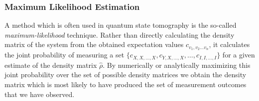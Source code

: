 \subsubsection{Maximum Likelihood Estimation}

A method which is often used in quantum state tomography is the so-called {\it maximum-likelihood} technique. Rather than directly calculating the density matrix of the system from the obtained expectation values $c_{v_1,v_2\hdots v_n}$, it calculates the joint probability of measuring a set $\{c_{X,X,\hdots,X},c_{Y,X,\hdots,X},\hdots,c_{I,I,\hdots,I}\}$ for a given estimate of the density matrix $\hat{\rho}$. By numerically or analytically maximizing this joint probability over the set of possible density matrices we obtain the density matrix which is most likely to have produced the set of measurement outcomes that we have observed.

